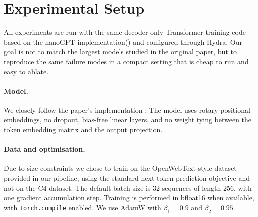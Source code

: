 \section{Experimental Setup}
\label{sec:setup}

All experiments are run with the same decoder-only Transformer training code based on the nanoGPT implementation(\cite{karpathy_nanogpt}) and configured through Hydra.
Our goal is not to match the largest models studied in the original paper, but
to reproduce the same failure modes in a compact setting that is cheap to run
and easy to ablate.

\paragraph{Model.}
We closely follow the paper's implementation : The model uses rotary positional embeddings, no dropout, bias-free linear layers, and no weight tying between the token embedding matrix and the output
projection.

\paragraph{Data and optimisation.}
Due to size constraints we chose to train on the OpenWebText-style dataset provided in our pipeline, using the
standard next-token prediction objective and not on the C4 dataset.
The default batch size is 32 sequences of length 256, with one gradient
accumulation step.
Training is performed in bfloat16 when available, with \texttt{torch.compile}
enabled.
We use AdamW with $\beta_1=0.9$ and $\beta_2=0.95$.
